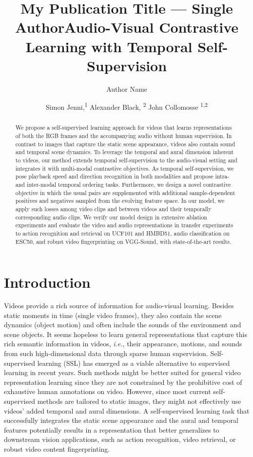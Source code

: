 \documentclass[letterpaper]{article}
\title{My Publication Title --- Single Author}
\author {
    Author Name
}
\title{Audio-Visual Contrastive Learning with Temporal Self-Supervision} %
\author {
    Simon Jenni,\textsuperscript{\rm 1}
    Alexander Black, \textsuperscript{\rm 2}
    John Collomosse \textsuperscript{\rm 1,\rm 2}
}
\newcommand{\ie}{\emph{i.e.}}
\begin{document}
\maketitle

\begin{abstract}
We propose a self-supervised learning approach for videos that learns representations of both the RGB frames and the accompanying audio without human supervision.
In contrast to images that capture the static scene appearance, videos also contain sound and temporal scene dynamics.
To leverage the temporal and aural dimension inherent to videos, our method extends temporal self-supervision to the audio-visual setting and integrates it with multi-modal contrastive objectives.
As temporal self-supervision, we pose playback speed and direction recognition in both modalities and propose intra- and inter-modal temporal ordering tasks.
Furthermore, we design a novel contrastive objective in which the usual pairs are supplemented with additional sample-dependent positives and negatives sampled from the evolving feature space.
In our model, we apply such losses among video clips and between videos and their temporally corresponding audio clips.
We verify our model design in extensive ablation experiments and evaluate the video and audio representations in transfer experiments to action recognition and retrieval on UCF101 and HMBD51, audio classification on ESC50, and robust video fingerprinting on VGG-Sound, with state-of-the-art results.

\end{abstract}




\section{Introduction}


Videos provide a rich source of information for audio-visual learning.
Besides static moments in time (single video frames), they also contain the scene dynamics (object motion) and often include the sounds of the environment and scene objects.
It seems hopeless to learn general representations that capture this rich semantic information in videos, \ie, their appearance, motions, and sounds from such high-dimensional data through sparse human supervision.
Self-supervised learning (SSL) \cite{Carl2015,chen2020simple,he2020momentum} has emerged as a viable alternative to supervised learning in recent years.
Such methods might be better suited for general video representation learning since they are not constrained by the prohibitive cost of exhaustive human annotations on video.
However, since most current self-supervised methods are tailored to static images, they might not effectively use videos' added temporal and aural dimensions.
A self-supervised learning task that successfully integrates the static scene appearance and the aural and temporal features potentially results in a representation that better generalizes to downstream vision applications, such as action recognition, video retrieval, or robust video content fingerprinting.
\end{document}
